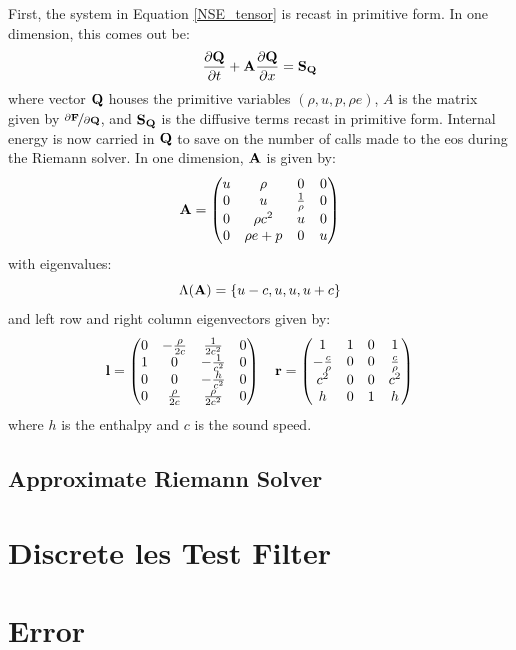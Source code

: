 First, the system in Equation \ref{NSE_tensor} is recast in primitive form. In one dimension, this comes out be: 
\begin{equation} \label{NSE_primitive}
\dfrac{\partial \vb{Q}}{\partial t} + \vb{A} \dfrac{\partial \vb{Q}}{\partial x} = \vb{S_Q}
\end{equation}
where vector $\vb{Q}$ houses the primitive variables $(\rho, u, p, \rho e )$, $A$ is the matrix given by $\nicefrac{\partial \vb{F}}{\partial \vb{Q}}$, and $\vb{S_Q}$ is the diffusive terms recast in primitive form. Internal energy is now carried in $\vb{Q}$ to save on the number of calls made to the \gls{eos} during the Riemann solver. In one dimension, $\vb{A}$ is given by: 
\begin{equation} \label{A_1D}
\vb{A} =
 \begin{pmatrix} 
u & \rho & 0 & 0\\
0 & u & \tfrac{1}{\rho} & 0\\
0 & \rho c^2 & u & 0\\
0 & \rho e + p & 0 & u
\end{pmatrix}
\end{equation}
with eigenvalues:
\begin{equation} \label{A_eigenvalues}
\Lambda(\vb{A}) = \{u-c, u, u, u+c\}
\end{equation}
and left row and right column eigenvectors given by: 
\begin{equation} \label{A_eigenvectors}
\vb{l} = 
 \begin{pmatrix} 
0 & - \tfrac{\rho}{2c} & \tfrac{1}{2c^2} & 0\\
1 & 0 & -\tfrac{1}{c^2} & 0\\
0 & 0 & -\tfrac{h}{c^2} & 0\\
0 & \tfrac{\rho}{2c} & \tfrac{\rho}{2c^2} & 0
\end{pmatrix} \quad
\vb{r} = 
 \begin{pmatrix} 
1 & 1 & 0 & 1\\
-\tfrac{c}{\rho} & 0 & 0 & \tfrac{c}{\rho} \\
c^2 & 0 & 0 & c^2\\
h & 0 & 1 & h
\end{pmatrix} 
\end{equation}
where $h$ is the enthalpy and $c$ is the sound speed. 

\subsection{Approximate Riemann Solver}
\section{Discrete \gls{les} Test Filter}
\section{Error}



